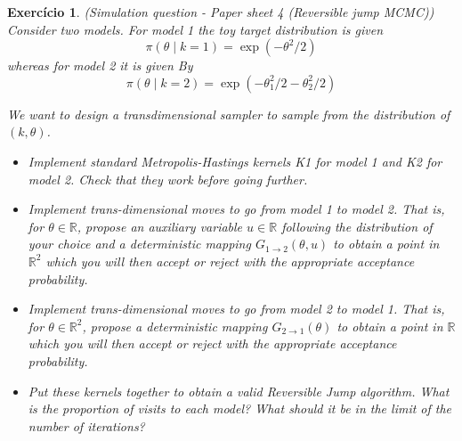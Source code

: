 \documentclass[a4paper,12pt]{article}
\newcommand{\R}{\mathbb{R}}
\newtheorem{exercise}{Exercício}
\theoremstyle{definition}
\begin{document}
\begin{exercise}
    (Simulation question - Paper sheet 4 (Reversible jump MCMC))
    Consider two models. For model 1 the toy target distribution is given 
    $$
    \pi(\theta \mid k = 1) = \exp(-\theta^2/2)
    $$
    whereas for model 2 it is given By
    $$
    \pi(\theta \mid k = 2) = \exp(-\theta_1^2/2 - \theta_2^2/2)
    $$

We want to design a transdimensional sampler to sample from the distribution
of $(k, \theta)$.

\begin{itemize}
    \item Implement standard Metropolis-Hastings kernels K1 for model 1 and K2 for model 2. Check that they
    work before going further.
    \item Implement trans-dimensional moves to go from model 1 to model 2. That is, for $\theta \in \R$, propose
    an auxiliary variable $u \in \R$ following the distribution of your choice and a deterministic mapping
    $G_{1\to 2}(\theta, u)$ to obtain a point in $\R^2$ which you will then accept or reject with the appropriate acceptance
    probability.
    \item Implement trans-dimensional moves to go from model 2 to model 1.
    That is, for $\theta \in \R^2$, propose a deterministic mapping $G_{2\to
    1}(\theta)$ to obtain a point in $\R$ which you will then accept or
    reject with the appropriate acceptance probability.
    \item Put these kernels together to obtain a valid Reversible Jump algorithm. What is the proportion of
    visits to each model? What should it be in the limit of the number of
    iterations?
\end{itemize}

\end{exercise}

% 
% 
\end{document}
